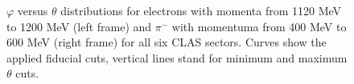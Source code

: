 \begin{figure}[htp]
\begin{center}
\begin{minipage}{.49\textwidth}
\end{minipage}
\begin{minipage}{.49\textwidth}
\end{minipage}
\caption{\small $\varphi$ versus $\theta$ distributions for electrons with momenta from 1120 MeV to 1200 MeV (left frame) and $\pi^{-}$ with momentuma from 400 MeV to 600 MeV (right frame) for all six CLAS sectors. Curves show the applied fiducial cuts, vertical lines stand for minimum and maximum $\theta$ cuts. \label{fig:eother_cuts_negative_fiduch_2d}}
\end{center}
\end{figure}







